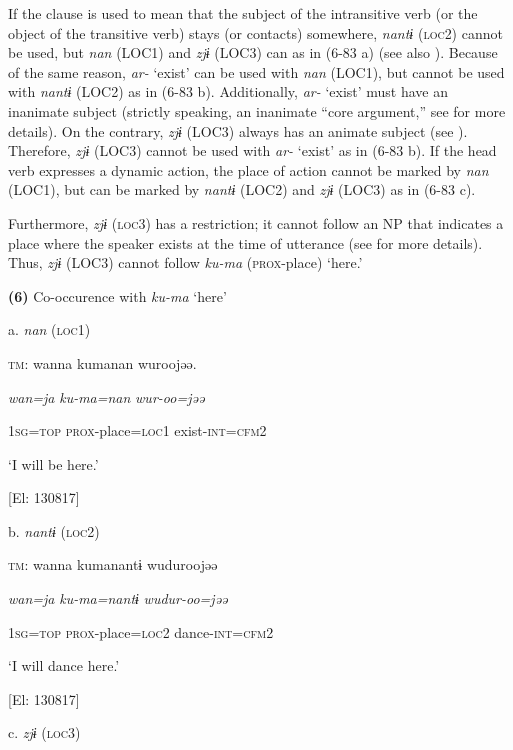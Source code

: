 If the clause is used to mean that the subject of the intransitive verb (or the object of the transitive verb) stays (or contacts) somewhere, \textit{nantɨ} (\textsc{loc}2) cannot be used, but \textit{nan} (LOC1) and \textit{zjɨ} (LOC3) can as in (6-83 a) (see also ). Because of the same reason, \textit{ar-} ‘exist’ can be used with \textit{nan} (LOC1), but cannot be used with \textit{nantɨ} (LOC2) as in (6-83 b). Additionally, \textit{ar-} ‘exist’ must have an inanimate subject (strictly speaking, an inanimate “core argument,” see  for more details). On the contrary, \textit{zjɨ} (LOC3) always has an animate subject (see ). Therefore, \textit{zjɨ} (LOC3) cannot be used with \textit{ar-} ‘exist’ as in (6-83 b). If the head verb expresses a dynamic action, the place of action cannot be marked by \textit{nan} (LOC1), but can be marked by \textit{nantɨ} (LOC2) and \textit{zjɨ} (LOC3) as in (6-83 c).

  Furthermore, \textit{zjɨ} (\textsc{loc}3) has a restriction; it cannot follow an NP that indicates a place where the speaker exists at the time of utterance (see  for more details). Thus, \textit{zjɨ} (LOC3) cannot follow \textit{ku-ma} (\textsc{prox}-place) ‘here.’

\textbf{(6)}  Co-occurence with \textit{ku-ma} ‘here’

  a.  \textit{nan} (\textsc{loc}1)

    \textsc{tm}:  wanna  kumanan  wuroojəə.

      \textit{wan=ja}  \textit{ku-ma=nan}  \textit{wur-oo=jəə}

      1\textsc{sg}=\textsc{top}  \textsc{prox}-place=\textsc{loc}1  exist-\textsc{int}=\textsc{cfm}2

      ‘I will be here.’

      [El: 130817]

  b.  \textit{nantɨ} (\textsc{loc}2)

    \textsc{tm}:  wanna  kumanantɨ  wuduroojəə

      \textit{wan=ja}  \textit{ku-ma=nantɨ}  \textit{wudur-oo=jəə}

      1\textsc{sg}=\textsc{top}  \textsc{prox}-place=\textsc{loc}2  dance-\textsc{int}=\textsc{cfm}2

      ‘I will dance here.’

      [El: 130817]

  c.  \textit{zjɨ} (\textsc{loc}3)


